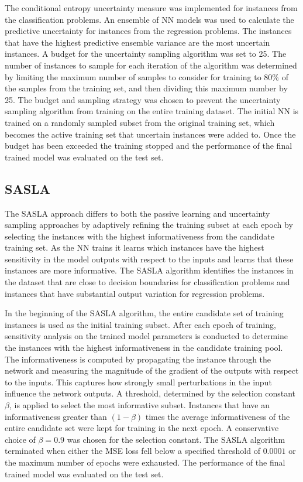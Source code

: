 \documentclass[conference]{IEEEtran}
\begin{document}
	The conditional entropy uncertainty measure was implemented for instances from the classification problems. An ensemble of NN models was used to calculate the predictive uncertainty for instances from the regression problems. The instances that have the highest predictive ensemble variance are the most uncertain instances. A budget for the uncertainty sampling algorithm was set to 25. The number of instances to sample for each iteration of the algorithm was determined by limiting the maximum number of samples to consider for training to 80\% of the samples from the training set, and then dividing this maximum number by 25. The budget and sampling strategy was chosen to prevent the uncertainty sampling algorithm from training on the entire training dataset. The initial NN is trained on a randomly sampled subset from the original training set, which becomes the active training set that uncertain instances were added to. Once the budget has been exceeded the training stopped and the performance of the final trained model was evaluated on the test set.
	
	\subsection{SASLA}
	The SASLA approach differs to both the passive learning and uncertainty sampling approaches by adaptively refining the training subset at each epoch by selecting the instances with the highest informativeness from the candidate training set. As the NN trains it learns which instances have the highest sensitivity in the model outputs with respect to the inputs and learns that these instances are more informative. The SASLA algorithm identifies the instances in the dataset that are close to decision boundaries for classification problems and instances that have substantial output variation for regression problems.
	
	In the beginning of the SASLA algorithm, the entire candidate set of training instances is used as the initial training subset. After each epoch of training, sensitivity analysis on the trained model parameters is conducted to determine the instances with the highest informativeness in the candidate training pool. The informativeness is computed by propagating the instance through the network and measuring the magnitude of the gradient of the outputs with respect to the inputs. This captures how strongly small perturbations in the input influence the network outputs. A threshold, determined by the selection constant $\beta$, is applied to select the most informative subset. Instances that have an informativeness greater than $(1-\beta)$ times the average informativeness of the entire candidate set were kept for training in the next epoch. A conservative choice of $\beta=0.9$ was chosen for the selection constant. The SASLA algorithm terminated when either the MSE loss fell below a specified threshold of $0.0001$ or the maximum number of epochs were exhausted. The performance of the final trained model was evaluated on the test set.
	
\end{document}
